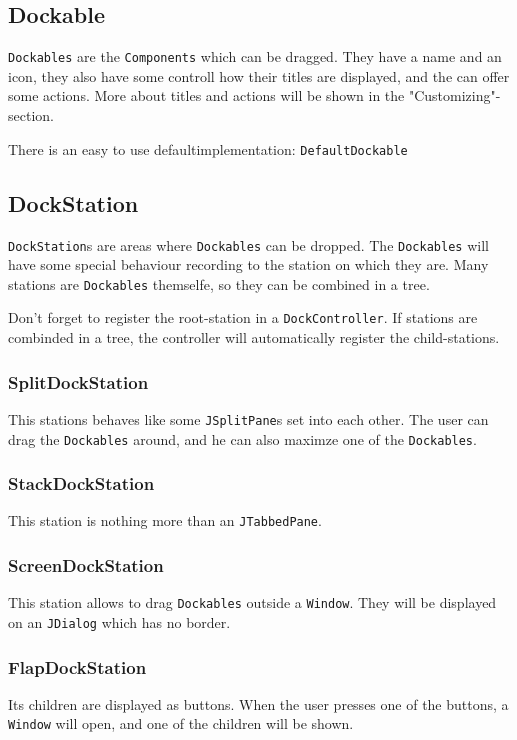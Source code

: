 \documentclass{article}
\begin{document}
\subsection{Dockable}
\verb!Dockables! are the \verb!Components! which can be dragged. They have a name and an icon, they also have some controll how their titles are displayed, and the can offer some actions. More about titles and actions will be shown in the "Customizing"-section.

There is an easy to use defaultimplementation: \verb!DefaultDockable!

\subsection{DockStation}
\verb!DockStation!s are areas where \verb!Dockables! can be dropped. The \verb!Dockables! will have some special behaviour recording to the station on which they are. Many stations are \verb!Dockables! themselfe, so they can be combined in a tree.

Don't forget to register the root-station in a \verb!DockController!. If stations are combinded in a tree, the controller will automatically register the child-stations.

\subsubsection{SplitDockStation}
This stations behaves like some \verb!JSplitPane!s set into each other. The user can drag the \verb!Dockables! around, and he can also maximze one of the \verb!Dockables!.

\subsubsection{StackDockStation}
This station is nothing more than an \verb!JTabbedPane!.

\subsubsection{ScreenDockStation}
This station allows to drag \verb!Dockables! outside a \verb!Window!. They will be displayed on an \verb!JDialog! which has no border.

\subsubsection{FlapDockStation}
Its children are displayed as buttons. When the user presses one of the buttons, a \verb!Window! will open, and one of the children will be shown.
\end{document}
